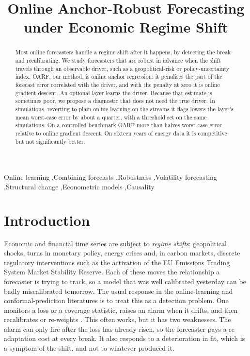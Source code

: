 \documentclass[authoryear,preprint,12pt]{elsarticle}
\theoremstyle{plain}
\theoremstyle{remark}
\begin{document}
\begin{frontmatter}

\title{Online Anchor-Robust Forecasting under Economic Regime Shift}


\begin{abstract}
Most online forecasters handle a regime shift after it happens, by detecting the
break and recalibrating. We study forecasters that are robust in advance when
the shift travels through an observable driver, such as a geopolitical-risk or
policy-uncertainty index. OARF, our method, is online anchor regression: it
penalises the part of the forecast error correlated with the driver, and with
the penalty at zero it is online gradient descent. An optional layer learns the
driver. Because that estimate is sometimes poor, we propose a diagnostic that
does not need the true driver. In simulations, reverting to plain online
learning on the streams it flags lowers the layer's mean worst-case error by
about a quarter, with a threshold set on the same simulations. On a controlled
benchmark OARF more than halves worst-case error relative to online gradient
descent. On sixteen years of energy data it is competitive but not significantly
better.
\end{abstract}

\begin{keyword}
Online learning \sep Combining forecasts \sep Robustness \sep Volatility forecasting \sep Structural change \sep Econometric models \sep Causality
\end{keyword}

\end{frontmatter}

\section{Introduction}\label{sec:intro}

Economic and financial time series are subject to \emph{regime shifts}:
geopolitical shocks, turns in monetary policy, energy crises and, in carbon
markets, discrete regulatory interventions such as the activation of the EU
Emissions Trading System Market Stability Reserve. Each of these moves the
relationship a forecaster is trying to track, so a model that was well calibrated
yesterday can be badly miscalibrated tomorrow. The usual response in the
online-learning and conformal-prediction literatures is to treat this as a
detection problem. One monitors a loss or a coverage statistic, raises an alarm
when it drifts, and then recalibrates or re-weights
\citep{gibbs2021aci,mfisher2025,watch2025}. This often works, but it has two
weaknesses. The alarm can only fire after the loss has
already risen, so the forecaster pays a re-adaptation cost at every break. It also
responds to a deterioration in fit, which is a symptom of the shift, and not to
whatever produced it.
\end{document}
